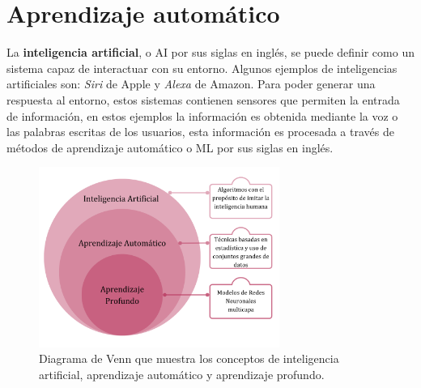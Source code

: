 \chapter{Aprendizaje automático}\label{ch:ML}




La \textbf{inteligencia artificial}, o AI por sus siglas en inglés, se puede definir como un sistema capaz de interactuar con su entorno. Algunos ejemplos de inteligencias artificiales son: \emph{Siri} de Apple y \emph{Alexa} de Amazon. Para poder generar una respuesta al entorno, estos sistemas contienen sensores que permiten la entrada de información, en estos ejemplos la información es obtenida mediante la voz o las palabras escritas de los usuarios, esta información es procesada a través de métodos de aprendizaje automático o ML por sus siglas en inglés.

\begin{figure}[!htbp]
  \centering
  \includegraphics[width=0.7\textwidth]{./img/IA_ML_DL.png}
  \caption{Diagrama de Venn que muestra los conceptos de inteligencia artificial, aprendizaje automático y aprendizaje profundo.}
  \label{fig:IA-ML-DL}
\end{figure}

